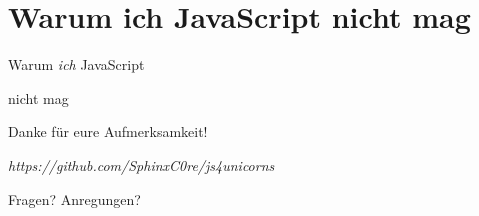 \documentclass{beamer}
\begin{document}

\section{Warum ich JavaScript nicht mag}

\begin{frame}
\Huge{
\centerline{Warum \textit{ich} JavaScript}
\centerline{nicht mag}
}
\end{frame}


\begin{frame}
\Huge{\centerline{Danke für eure Aufmerksamkeit!}}
\begin{small}
\textit{https://github.com/SphinxC0re/js4unicorns}
\end{small}
\end{frame}

\begin{frame}
\Huge{\centerline{Fragen? Anregungen?}}
\end{frame}

\end{document}

